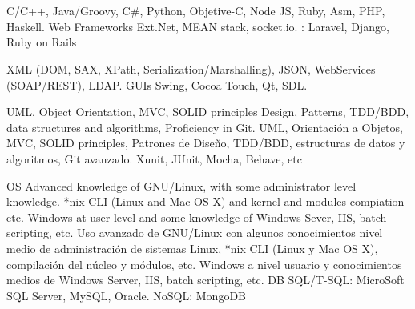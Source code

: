 \section{}


\cvcomputer
    {}
        {C/C++, Java/Groovy, C\#, Python, Objetive-C, Node JS, Ruby, Asm, PHP,
        Haskell.}
    {Web Frameworks}
        {Ext.Net, MEAN stack, socket.io. : Laravel,
        Django, Ruby on Rails}

\cvcomputer
    {}
        {XML (DOM, SAX, XPath, Serialization/Marshalling), JSON, WebServices
        (SOAP/REST), LDAP.}
	{GUIs}
        {Swing, Cocoa Touch, Qt, SDL.}


\cvcomputer
    {}
        {\ml
            {UML, Object Orientation, MVC, SOLID principles Design, Patterns,
            TDD/BDD, data structures and algorithms, Proficiency in Git.}
            {UML, Orientación a Objetos, MVC, SOLID principles, Patrones de
            Diseño, TDD/BDD, estructuras de datos y algoritmos, Git avanzado.}
        }
    {}
        {Xunit, JUnit, Mocha, Behave, etc}



\cvcomputer
    {OS}
        {\ml
            {Advanced knowledge of GNU/Linux, with some administrator level
            knowledge. *nix CLI (Linux and Mac OS X) and kernel and modules
            compiation etc. Windows at user level and some knowledge of Windows
            Sever, IIS, batch scripting, etc.}
            {Uso avanzado de GNU/Linux con algunos conocimientos nivel medio de
            administración de sistemas Linux, *nix CLI (Linux y Mac OS X),
            compilación del núcleo y módulos, etc. Windows a nivel usuario y
            conocimientos medios de Windows Server, IIS, batch scripting, etc.}
        }
    {DB}
        {SQL/T-SQL: MicroSoft SQL Server, MySQL, Oracle. NoSQL: MongoDB}

